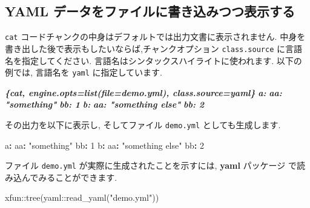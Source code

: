 \documentclass[
  11pt,
  lualatex,
  ja=standard]{bxjsreport}
\newenvironment{Shaded}{\begin{snugshade}}{\end{snugshade}}
\newcommand{\AttributeTok}[1]{\textcolor[rgb]{0.77,0.63,0.00}{#1}}
\newcommand{\DecValTok}[1]{\textcolor[rgb]{0.00,0.00,0.81}{#1}}
\newcommand{\FunctionTok}[1]{\textcolor[rgb]{0.00,0.00,0.00}{#1}}
\newcommand{\InformationTok}[1]{\textcolor[rgb]{0.56,0.35,0.01}{\textbf{\textit{#1}}}}
\newcommand{\KeywordTok}[1]{\textcolor[rgb]{0.13,0.29,0.53}{\textbf{#1}}}
\newcommand{\NormalTok}[1]{#1}
\newcommand{\SpecialCharTok}[1]{\textcolor[rgb]{0.00,0.00,0.00}{#1}}
\newcommand{\StringTok}[1]{\textcolor[rgb]{0.31,0.60,0.02}{#1}}
\begin{document}
\hypertarget{yaml-ux30c7ux30fcux30bfux3092ux30d5ux30a1ux30a4ux30ebux306bux66f8ux304dux8fbcux307fux3064ux3064ux8868ux793aux3059ux308b}{%
\subsection{YAML データをファイルに書き込みつつ表示する}\label{yaml-ux30c7ux30fcux30bfux3092ux30d5ux30a1ux30a4ux30ebux306bux66f8ux304dux8fbcux307fux3064ux3064ux8868ux793aux3059ux308b}}

\texttt{cat} コードチャンクの中身はデフォルトでは出力文書に表示されません. 中身を書き出した後で表示もしたいならば,チャンクオプション \texttt{class.source} に言語名を指定してください. 言語名はシンタックスハイライトに使われます. 以下の例では, 言語名を \texttt{yaml} に指定しています.

\begin{Shaded}
\begin{Highlighting}[]
\InformationTok{\textasciigrave{}\textasciigrave{}\textasciigrave{}\{cat, engine.opts=list(file=\textquotesingle{}demo.yml\textquotesingle{}), class.source=\textquotesingle{}yaml\textquotesingle{}\}}
\InformationTok{a:}
\InformationTok{  aa: "something"}
\InformationTok{  bb: 1}
\InformationTok{b:}
\InformationTok{  aa: "something else"}
\InformationTok{  bb: 2}
\InformationTok{\textasciigrave{}\textasciigrave{}\textasciigrave{}}
\end{Highlighting}
\end{Shaded}

その出力を以下に表示し, そしてファイル \texttt{demo.yml} としても生成します.

\begin{Shaded}
\begin{Highlighting}[numbers=left,,]
\FunctionTok{a}\KeywordTok{:}
\AttributeTok{  }\FunctionTok{aa}\KeywordTok{:}\AttributeTok{ }\StringTok{"something"}
\AttributeTok{  }\FunctionTok{bb}\KeywordTok{:}\AttributeTok{ }\DecValTok{1}
\FunctionTok{b}\KeywordTok{:}
\AttributeTok{  }\FunctionTok{aa}\KeywordTok{:}\AttributeTok{ }\StringTok{"something else"}
\AttributeTok{  }\FunctionTok{bb}\KeywordTok{:}\AttributeTok{ }\DecValTok{2}
\end{Highlighting}
\end{Shaded}

ファイル \texttt{demo.yml} が実際に生成されたことを示すには, \textbf{yaml} パッケージ \autocite{R-yaml} で読み込んでみることができます.

\begin{Shaded}
\begin{Highlighting}[numbers=left,,]
\NormalTok{xfun}\SpecialCharTok{::}\FunctionTok{tree}\NormalTok{(yaml}\SpecialCharTok{::}\FunctionTok{read\_yaml}\NormalTok{(}\StringTok{"demo.yml"}\NormalTok{))}
\end{Highlighting}
\end{Shaded}
\end{document}

